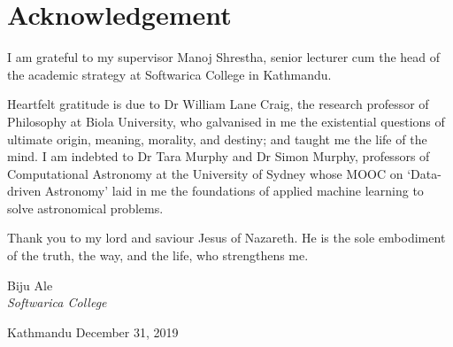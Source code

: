 \section*{Acknowledgement}
I am grateful to my supervisor Manoj Shrestha, senior lecturer cum the head of the academic strategy at Softwarica College in Kathmandu.\newline

Heartfelt gratitude is due to Dr William Lane Craig, the research professor of Philosophy at Biola University, who galvanised in me the existential questions of ultimate origin, meaning, morality, and destiny; and taught me the life of the mind. I am indebted to Dr Tara Murphy and Dr Simon Murphy, professors of Computational Astronomy at the University of Sydney whose MOOC on `Data-driven Astronomy' laid in me the foundations of applied machine learning to solve astronomical problems.\newline

Thank you to my lord and saviour Jesus of Nazareth. He is the sole embodiment of the truth, the way, and the life, who strengthens me.\newline

Biju Ale\\
\textit{Softwarica College}\newline

\small Kathmandu\newline
December 31, 2019
